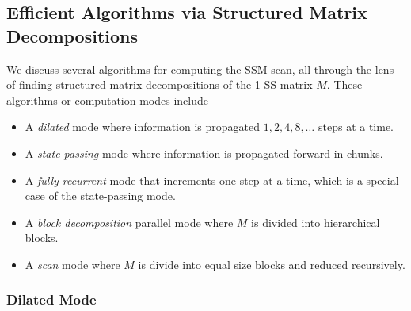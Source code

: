 \documentclass{article}
\begin{document}
\subsection{Efficient Algorithms via Structured Matrix Decompositions}

We discuss several algorithms for computing the SSM scan, all through the lens of finding structured matrix decompositions of the 1-SS matrix $M$.
These algorithms or computation modes include
\begin{itemize}
  \item A \emph{dilated} mode where information is propagated $1, 2, 4, 8, \dots$ steps at a time.
  \item A \emph{state-passing} mode where information is propagated forward in chunks.
  \item A \emph{fully recurrent} mode that increments one step at a time, which is a special case of the state-passing mode.
  \item A \emph{block decomposition} parallel mode where $M$ is divided into hierarchical blocks.
  \item A \emph{scan} mode where $M$ is divide into equal size blocks and reduced recursively.
\end{itemize}

\subsubsection{Dilated Mode}
\end{document}
